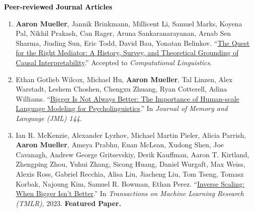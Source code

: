 \documentclass[10pt]{article}
\renewcommand{\subsection}[1]{\textcolor{black}{#1}}
\newcommand{\halfblankline}{\quad\vspace{-0.5\baselineskip}\pagebreak[3]}
\providecommand*\titlelink[2]{\href{#1}{\textcolor{accent}{#2}}}
\begin{document}
	\subsection{\textbf{Peer-reviewed Journal Articles}}
	\begin{enumerate}[leftmargin=*, topsep=0pt, itemsep=0.25ex, partopsep=0ex, parsep=1ex, label=J\arabic*., ref=J\arabic*]

	\item \textbf{Aaron Mueller}, Jannik Brinkmann, Millicent Li, Samuel Marks, Koyena Pal, Nikhil Prakash, Can Rager, Aruna Sankaranarayanan, Arnab Sen Sharma, Jiuding Sun, Eric Todd, David Bau, Yonatan Belinkov. ``\titlelink{https://arxiv.org/abs/2407.04690v1}{The Quest for the Right Mediator: A History, Survey, and Theoretical Grounding of Causal Interpretability}.'' Accepted to \emph{Computational Linguistics}.
	
	\item Ethan Gotlieb Wilcox, Michael Hu, \textbf{Aaron Mueller}, Tal Linzen, Alex Warstadt, Leshem Choshen, Chengxu Zhuang, Ryan Cotterell, Adina Williams. ``\titlelink{https://osf.io/preprints/psyarxiv/rfwgd}{Bigger Is Not Always Better: The Importance of Human-scale Language Modeling for Psycholinguistics}.'' In \emph{Journal of Memory and Language (JML) 144}.

	\item Ian R. McKenzie, Alexander Lyzhov, Michael Martin Pieler, Alicia Parrish, \textbf{Aaron Mueller}, Ameya Prabhu, Euan McLean, Xudong Shen, Joe Cavanagh, Andrew George Gritsevskiy, Derik Kauffman, Aaron T. Kirtland, Zhengping Zhou, Yuhui Zhang, Sicong Huang, Daniel Wurgaft, Max Weiss, Alexis Ross, Gabriel Recchia, Alisa Liu, Jiacheng Liu, Tom Tseng, Tomasz Korbak, Najoung Kim, Samuel R. Bowman, Ethan Perez. ``\titlelink{https://arxiv.org/abs/2306.09479}{Inverse Scaling: When Bigger Isn't Better}.'' In \emph{Transactions on Machine Learning Research (TMLR)}, 2023. \textbf{\textcolor{accent}{Featured Paper.}}

	\end{enumerate}

	\halfblankline
\end{document}
